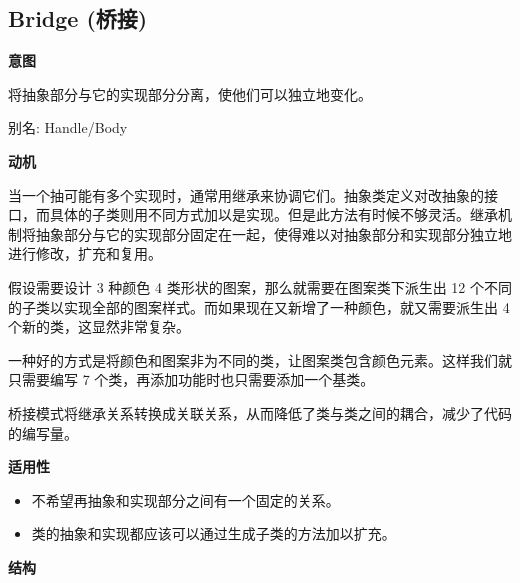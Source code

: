 \subsection{Bridge (桥接)}

\noindent\textbf{意图}

将抽象部分与它的实现部分分离，使他们可以独立地变化。

别名: Handle/Body

\noindent\textbf{动机}

当一个抽可能有多个实现时，通常用继承来协调它们。抽象类定义对改抽象的接口，而具体的子类则用不同方式加以是实现。但是此方法有时候不够灵活。继承机制将抽象部分与它的实现部分固定在一起，使得难以对抽象部分和实现部分独立地进行修改，扩充和复用。

假设需要设计 3 种颜色 4 类形状的图案，那么就需要在图案类下派生出 12 个不同的子类以实现全部的图案样式。而如果现在又新增了一种颜色，就又需要派生出 4 个新的类，这显然非常复杂。

一种好的方式是将颜色和图案非为不同的类，让图案类包含颜色元素。这样我们就只需要编写 7 个类，再添加功能时也只需要添加一个基类。

桥接模式将继承关系转换成关联关系，从而降低了类与类之间的耦合，减少了代码的编写量。

\noindent\textbf{适用性}

\begin{itemize}
    \item 不希望再抽象和实现部分之间有一个固定的关系。
    \item 类的抽象和实现都应该可以通过生成子类的方法加以扩充。
\end{itemize}

\noindent\textbf{结构}

